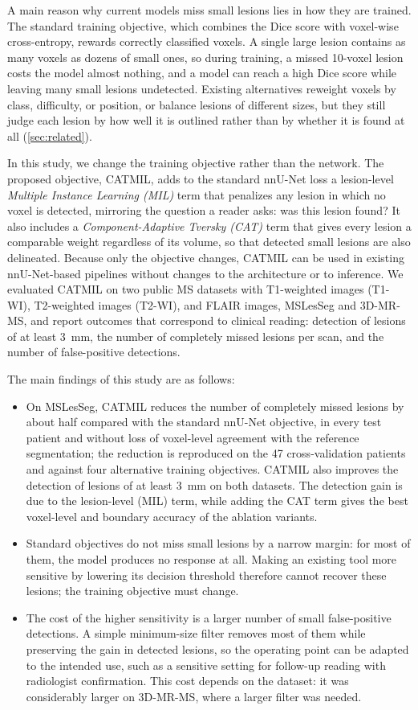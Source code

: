 A main reason why current models miss small lesions lies in how they are
trained. The standard training objective, which combines the Dice score
with voxel-wise cross-entropy, rewards correctly classified voxels. A
single large lesion contains as many voxels as dozens of small ones, so
during training, a missed 10-voxel lesion costs the model almost nothing,
and a model can reach a high Dice score while leaving many small lesions
undetected. Existing alternatives reweight voxels by class, difficulty, or
position, or balance lesions of different sizes, but they still judge each
lesion by how well it is outlined rather than by whether it is found at
all (\cref{sec:related}).

In this study, we change the training objective rather than the network.
The proposed objective, CATMIL, adds to the standard nnU-Net loss a
lesion-level \emph{Multiple Instance Learning (MIL)} term that penalizes
any lesion in which no voxel is detected, mirroring the question a reader
asks: was this lesion found? It also includes a \emph{Component-Adaptive
Tversky (CAT)} term that gives every lesion a comparable weight regardless
of its volume, so that detected small lesions are also delineated.
Because only the objective changes, CATMIL can be
used in existing nnU-Net-based pipelines without changes to the
architecture or to inference. We evaluated CATMIL on two public MS
datasets with T1-weighted images (T1-WI), T2-weighted images (T2-WI),
and FLAIR images, MSLesSeg and
3D-MR-MS, and report outcomes that correspond to clinical reading:
detection of lesions of at least 3~mm, the number of completely missed
lesions per scan, and the number of false-positive detections.

The main findings of this study are as follows:
\begin{itemize}
\item On MSLesSeg, CATMIL reduces the number of completely missed lesions
by about half compared with the standard nnU-Net objective, in every test
patient and without loss of voxel-level agreement with the reference
segmentation; the reduction is reproduced on the 47 cross-validation
patients and against four alternative training objectives. CATMIL also
improves the detection of lesions of at least 3~mm on both datasets. The
detection gain is due to the lesion-level (MIL) term, while adding the CAT
term gives the best voxel-level and boundary accuracy of the ablation
variants.
\item Standard objectives do not miss small lesions by a narrow margin:
for most of them, the model produces no response at all. Making an
existing tool more sensitive by lowering its decision threshold therefore
cannot recover these lesions; the training objective must change.
\item The cost of the higher sensitivity is a larger number of small
false-positive detections. A simple minimum-size filter removes most of
them while preserving the gain in detected lesions, so the operating point
can be adapted to the intended use, such as a sensitive setting for
follow-up reading with radiologist confirmation. This cost depends on the
dataset: it was considerably larger on 3D-MR-MS, where a larger filter was
needed.
\end{itemize}
